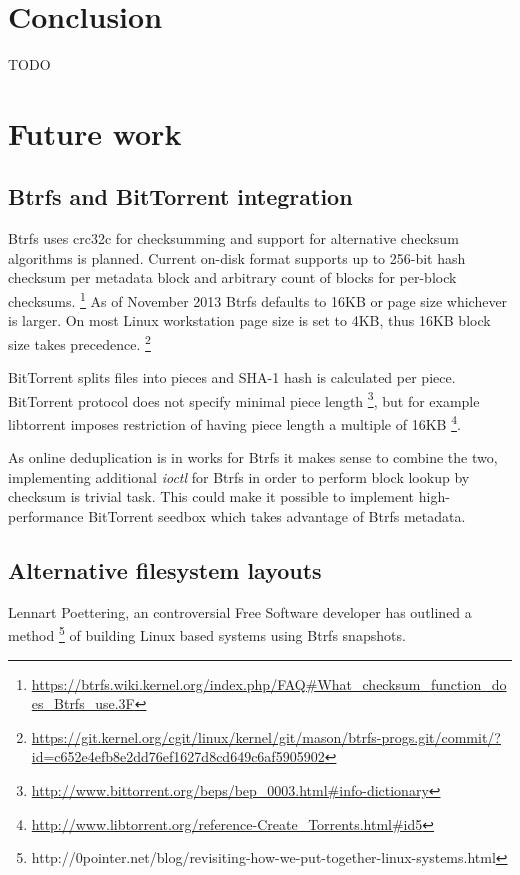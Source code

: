 \documentclass{article}
\begin{document}
\section{Conclusion}

TODO


\section{Future work}

\subsection{Btrfs and BitTorrent integration}

Btrfs uses crc32c for checksumming and support for alternative checksum algorithms is planned.
Current on-disk format supports up to 256-bit hash checksum per
metadata block and arbitrary count of blocks for per-block checksums.
\footnote{\url{https://btrfs.wiki.kernel.org/index.php/FAQ#What_checksum_function_does_Btrfs_use.3F}}
As of November 2013 Btrfs defaults to 16KB or page size whichever
is larger.
On most Linux workstation page size is set to 4KB, thus 16KB block
size takes precedence.
\footnote{\url{https://git.kernel.org/cgit/linux/kernel/git/mason/btrfs-progs.git/commit/?id=c652e4efb8e2dd76ef1627d8cd649c6af5905902}}

BitTorrent splits files into pieces and SHA-1 hash is calculated per piece.
BitTorrent protocol does not specify minimal piece length
\footnote{\url{http://www.bittorrent.org/beps/bep_0003.html#info-dictionary}},
but for example libtorrent imposes restriction of having piece length
a multiple of 16KB
\footnote{\url{http://www.libtorrent.org/reference-Create_Torrents.html#id5}}.

As online deduplication is in works for Btrfs it makes sense to combine the two,
implementing additional \emph{ioctl} for Btrfs in order to perform block lookup
by checksum is trivial task.
This could make it possible to implement high-performance BitTorrent seedbox
which takes advantage of Btrfs metadata.

\subsection{Alternative filesystem layouts}

Lennart Poettering, an controversial Free Software developer has outlined a method
\footnote{http://0pointer.net/blog/revisiting-how-we-put-together-linux-systems.html}
of building Linux based systems using Btrfs snapshots.



\end{document}
